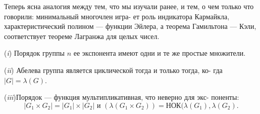 \documentclass{../template/mai_book}
\begin{document}
\begin{mynotice}
Теперь ясна аналогия между тем, что мы изучали ранее, и\linebreak
тем, о чем только что говорили: минимальный многочлен игра­-\linebreak
ет роль индикатора Кармайкла, характеристический полином —\linebreak
функции Эйлера, а теорема Гамильтона — Кэли, соответствует\linebreak
теореме Лагранжа для целых чисел.
\end{mynotice}

\begin{property}
\par \quad\;  (\textit{i}) Порядок группы $n$ ее экспонента имеют одни и те же простые\linebreak
множители.
\par  (\textit{ii}) Абелева группа является циклической тогда и только тогда, ко­-\linebreak
гда $|G| = \lambda(G)$.
\par  (\textit{iii})Порядок — функция мультипликативная, что неверно для экс­-\linebreak
поненты:
$$|G_1\times G_2| = |G_1|\times |G_2| \text{ и } (\lambda(G_1\times G_2)) = \text{НОК}(\lambda(G_1), \lambda(G_2).$$

\end{property}
\end{document}
